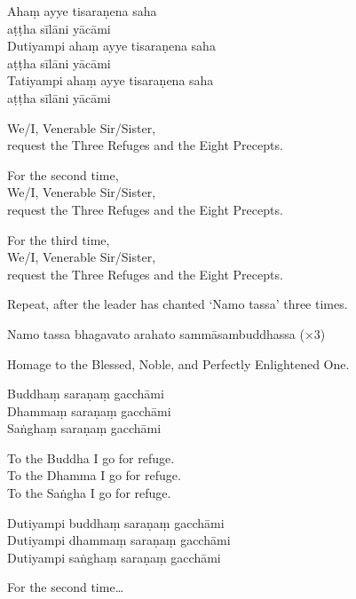 
Ahaṃ ayye tisaraṇena saha\\\vin aṭṭha sīlāni yācāmi\\
Dutiyampi ahaṃ ayye tisaraṇena saha\\\vin aṭṭha sīlāni yācāmi\\
Tatiyampi ahaṃ ayye tisaraṇena saha\\\vin aṭṭha sīlāni yācāmi

\begin{english}
  We/I, Venerable Sir/Sister,\\
  request the Three Refuges and the Eight Precepts.

  For the second time,\\
  We/I, Venerable Sir/Sister,\\
  request the Three Refuges and the Eight Precepts.

  For the third time,\\
  We/I, Venerable Sir/Sister,\\
  request the Three Refuges and the Eight Precepts.
\end{english}

\begin{instruction}
  Repeat, after the leader has chanted ‘Namo tassa’ three times.
\end{instruction}

Namo tassa bhagavato arahato sammāsambuddhassa (×3)

\begin{english}
  Homage to the Blessed, Noble, and Perfectly Enlightened One.
\end{english}

\ifhandbookedition
\clearpage
\fi

Buddhaṃ saraṇaṃ gacchāmi\\
Dhammaṃ saraṇaṃ gacchāmi\\
Saṅghaṃ saraṇaṃ gacchāmi

\begin{english}
  To the Buddha I go for refuge.\\
  To the Dhamma I go for refuge.\\
  To the Saṅgha I go for refuge.
\end{english}

Dutiyampi buddhaṃ saraṇaṃ gacchāmi\\
Dutiyampi dhammaṃ saraṇaṃ gacchāmi\\
Dutiyampi saṅghaṃ saraṇaṃ gacchāmi

\begin{english}
  For the second time\ldots
\end{english}

